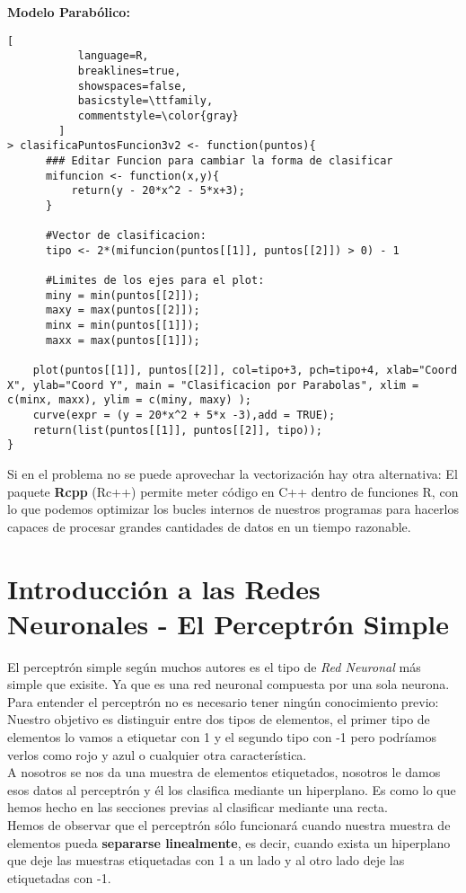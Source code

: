 \documentclass[11pt,fleqn]{book} %
\begin{document}
\textbf{Modelo Parabólico:}
\begin{lstlisting}[
           language=R,
           breaklines=true,
           showspaces=false,
           basicstyle=\ttfamily,
           commentstyle=\color{gray}
        ]
> clasificaPuntosFuncion3v2 <- function(puntos){
      ### Editar Funcion para cambiar la forma de clasificar
      mifuncion <- function(x,y){
          return(y - 20*x^2 - 5*x+3);
      }
    
      #Vector de clasificacion:
      tipo <- 2*(mifuncion(puntos[[1]], puntos[[2]]) > 0) - 1
      
      #Limites de los ejes para el plot:
      miny = min(puntos[[2]]);
      maxy = max(puntos[[2]]);
      minx = min(puntos[[1]]);
      maxx = max(puntos[[1]]);
    
    plot(puntos[[1]], puntos[[2]], col=tipo+3, pch=tipo+4, xlab="Coord X", ylab="Coord Y", main = "Clasificacion por Parabolas", xlim = c(minx, maxx), ylim = c(miny, maxy) );
    curve(expr = (y = 20*x^2 + 5*x -3),add = TRUE);
    return(list(puntos[[1]], puntos[[2]], tipo));
}
\end{lstlisting}

Si en el problema no se puede aprovechar la vectorización hay otra alternativa: El paquete \textbf{Rcpp} (Rc++) permite meter código en C++ dentro de funciones R, con lo que podemos optimizar los bucles internos de nuestros programas para hacerlos capaces de procesar grandes cantidades de datos en un tiempo razonable.

\section{Introducción a las Redes Neuronales - El Perceptrón Simple}
El perceptrón simple según muchos autores es el tipo de \textit{Red Neuronal} más simple que exisite. Ya que es una red neuronal compuesta por una sola neurona. Para entender el perceptrón no es necesario tener ningún conocimiento previo:\\
Nuestro objetivo es distinguir entre dos tipos de elementos, el primer tipo de elementos lo vamos a etiquetar con 1 y el segundo tipo con -1 pero podríamos verlos como rojo y azul o cualquier otra característica.\\
A nosotros se nos da una muestra de elementos etiquetados, nosotros le damos esos datos al perceptrón y él los clasifica mediante un hiperplano. Es como lo que hemos hecho en las secciones previas al clasificar mediante una recta.\\
Hemos de observar que el perceptrón sólo funcionará cuando nuestra muestra de elementos pueda \textbf{separarse linealmente}, es decir, cuando exista un hiperplano que deje las muestras etiquetadas con 1 a un lado y al otro lado deje las etiquetadas con -1.
\end{document}
